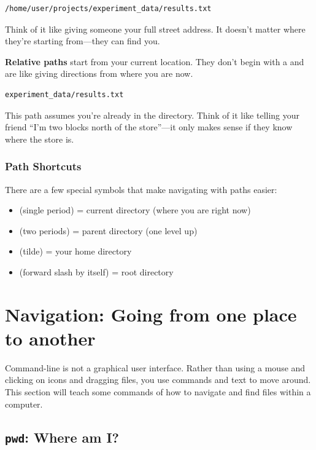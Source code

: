 \begin{lstlisting}
/home/user/projects/experiment_data/results.txt
\end{lstlisting}

Think of it like giving someone your full street address. It doesn't matter where they're starting from---they can find you.

\textbf{Relative paths} start from your current location. They don't begin with a \code{/} and are like giving directions from where you are now.

\begin{lstlisting}
experiment_data/results.txt
\end{lstlisting}

This path assumes you're already in the  directory. Think of it like telling your friend ``I'm two blocks north of the store''---it only makes sense if they know where the store is.

\subsubsection{Path Shortcuts}

There are a few special symbols that make navigating with paths easier:

\begin{itemize}
    \item {} (single period) = current directory (where you are right now)
    \item {} (two periods) = parent directory (one level up)
    \item \code{\textasciitilde} (tilde) = your home directory
    \item \code{/} (forward slash by itself) = root directory
\end{itemize}

\section{Navigation: Going from one place to another}

Command-line is not a graphical user interface. Rather than using a mouse and clicking on icons and dragging files, you use commands and text to move around. This section will teach some commands of how to navigate and find files within a computer.

\subsection{\texttt{pwd}: Where am I?}


